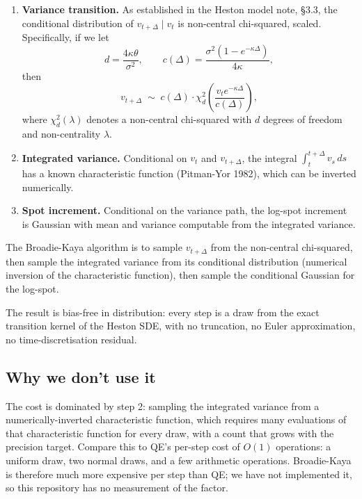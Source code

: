 \documentclass[11pt]{article}
\theoremstyle{plain}
\theoremstyle{definition}
\theoremstyle{remark}
\begin{document}
\begin{enumerate}[topsep=2pt]
    \item \textbf{Variance transition.} As established in the Heston model note, \S3.3, the conditional distribution of $v_{t+\Delta} \mid v_t$ is non-central chi-squared, scaled. Specifically, if we let
    \[
        d = \frac{4\kappa\theta}{\sigma^2}, \qquad
        c(\Delta) = \frac{\sigma^2 (1 - e^{-\kappa\Delta})}{4\kappa},
    \]
    then
    \[
        v_{t+\Delta} \;\sim\; c(\Delta) \cdot \chi^2_d\!\left(\frac{v_t e^{-\kappa\Delta}}{c(\Delta)}\right),
    \]
    where $\chi^2_d(\lambda)$ denotes a non-central chi-squared with $d$ degrees of freedom and non-centrality $\lambda$.

    \item \textbf{Integrated variance.} Conditional on $v_t$ and $v_{t+\Delta}$, the integral $\int_t^{t+\Delta} v_s\,ds$ has a known characteristic function (Pitman-Yor 1982), which can be inverted numerically.

    \item \textbf{Spot increment.} Conditional on the variance path, the log-spot increment is Gaussian with mean and variance computable from the integrated variance.
\end{enumerate}

The Broadie-Kaya algorithm is to sample $v_{t+\Delta}$ from the non-central chi-squared, then sample the integrated variance from its conditional distribution (numerical inversion of the characteristic function), then sample the conditional Gaussian for the log-spot.

The result is bias-free in distribution: every step is a draw from the exact transition kernel of the Heston SDE, with no truncation, no Euler approximation, no time-discretisation residual.

\subsection{Why we don't use it}

The cost is dominated by step 2: sampling the integrated variance from a numerically-inverted characteristic function, which requires many evaluations of that characteristic function for every draw, with a count that grows with the precision target. Compare this to QE's per-step cost of $O(1)$ operations: a uniform draw, two normal draws, and a few arithmetic operations. Broadie-Kaya is therefore much more expensive per step than QE; we have not implemented it, so this repository has no measurement of the factor.
\end{document}
